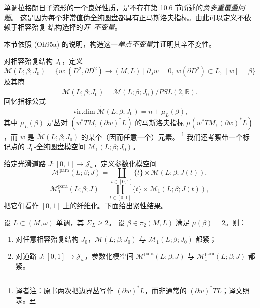 \section{\termOnePointOpenGromovWittenInvariant{}}
\label{sec:one-point-open-gw-invariant}

单调拉格朗日子流形的一个良好性质，是不存在第 10.6 节所述的\emph{负多重覆叠问题}。
这是因为每个非常值伪全纯圆盘都具有正马斯洛夫指标。由此可以定义不依赖于相容殆复
结构选择的\emph{开\personGromov{}--\personWitten{}不变量}。

本节依照 (Oh95a) 的说明，构造这一\emph{单点不变量}并证明其辛不变性。

对相容殆复结构 $J_0$，定义
\[
 \widetilde{\mathcal M}(L;\beta;J_0)
 =\{w:(D^2,\partial D^2)\to(M,L)\mid
 \overline\partial_Jw=0,\ w(\partial D^2)\subset L,\ [w]=\beta\}
\]
及其商
\[
 \mathcal M(L;\beta;J_0)
 =\widetilde{\mathcal M}(L;\beta;J_0)/PSL(2,\mathbb R).
\]
回忆指标公式
\begin{equation}
 \operatorname{vir.dim}\widetilde{\mathcal M}(L;\beta;J_0)
 =n+\mu_L(\beta),
\label{eq:disc-moduli-virtual-dimension}
\end{equation}
其中 $\mu_L(\beta)$ 是丛对 $(w^*TM,(\partial w)^*L)$ 的马斯洛夫指标
$\mu(w^*TM,(\partial w)^*L)$，而 $w$ 是
$\widetilde{\mathcal M}(L;\beta;J_0)$ 的某个（因而任意一个）元素。
\footnote{译者注：原书两次把边界丛写作 $(\partial w)^*L$，而非通常的
$(\partial w)^*TL$；译文照录。}
我们还考察带一个标记点的 $J_0$-全纯圆盘模空间
$\mathcal M_1(L;\beta;J_0)$。

给定光滑道路 $J:[0,1]\to\mathcal J_\omega$，定义参数化模空间
\[
 \mathcal M^{\mathrm{para}}(L;\beta;J)
 =\coprod_{t\in[0,1]}\{t\}\times\mathcal M(L;\beta;J(t)),
\]
\[
 \mathcal M_1^{\mathrm{para}}(L;\beta;J)
 =\coprod_{t\in[0,1]}\{t\}\times\mathcal M_1(L;\beta;J(t)),
\]
把它们看作 $[0,1]$ 上的纤维化。下面给出紧性结果。

\begin{proposition}
\label{prop:minimal-maslov-two-disc-compactness}
设 $L\subset(M,\omega)$ 单调，其\termMinimalMaslovNumber{} $\Sigma_L\geq2$。
设 $\beta\in\pi_2(M,L)$ 满足 $\mu(\beta)=2$。则：
\begin{enumerate}[label=(\arabic*)]
\item 对任意相容殆复结构 $J_0$，$\mathcal M(L;\beta;J_0)$ 与
$\mathcal M_1(L;\beta;J_0)$ 都紧；
\item 对道路 $J:[0,1]\to\mathcal J_\omega$，参数化模空间
$\mathcal M^{\mathrm{para}}(L;\beta;J)$ 与
$\mathcal M_1^{\mathrm{para}}(L;\beta;J)$ 都紧。
\end{enumerate}
\end{proposition}

